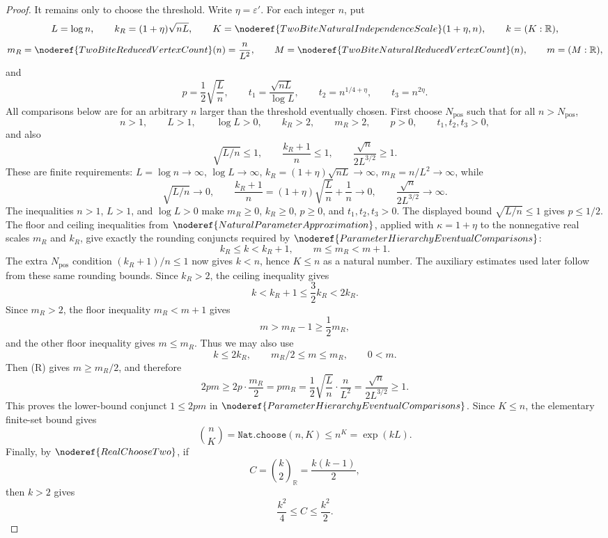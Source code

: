 \begin{proof}
It remains only to choose the threshold.  Write \(\eta=\varepsilon'\).  For
each integer \(n\), put
\[
L=\log n,\qquad
k_R=(1+\eta)\sqrt{nL},\qquad
K=\noderef{TwoBiteNaturalIndependenceScale}(1+\eta,n),\qquad
k=(K:\mathbb R),
\]
\[
m_R=\noderef{TwoBiteReducedVertexCount}(n)=\frac{n}{L^2},\qquad
M=\noderef{TwoBiteNaturalReducedVertexCount}(n),\qquad
m=(M:\mathbb R),
\]
and
\[
p=\frac12\sqrt{\frac{L}{n}},\qquad
t_1=\frac{\sqrt{nL}}{\log L},\qquad
t_2=n^{1/4+\eta},\qquad
t_3=n^{2\eta}.
\]
All comparisons below are for an arbitrary \(n\) larger than the threshold
eventually chosen.  First choose \(N_{\mathrm{pos}}\) such that for all
\(n>N_{\mathrm{pos}}\),
\[
n>1,\qquad L>1,\qquad \log L>0,\qquad k_R>2,\qquad m_R>2,
\qquad p>0,\qquad t_1,t_2,t_3>0,
\]
and also
\[
\sqrt{L/n}\le1,\qquad \frac{k_R+1}{n}\le1,\qquad
\frac{\sqrt n}{2L^{3/2}}\ge1.
\]
These are finite requirements: \(L=\log n\to\infty\),
\(\log L\to\infty\), \(k_R=(1+\eta)\sqrt{nL}\to\infty\),
\(m_R=n/L^2\to\infty\), while
\[
\sqrt{L/n}\to0,\qquad
\frac{k_R+1}{n}
= (1+\eta)\sqrt{\frac Ln}+\frac1n\to0,\qquad
\frac{\sqrt n}{2L^{3/2}}\to\infty.
\]
The inequalities \(n>1\), \(L>1\), and \(\log L>0\) make
\(m_R\ge0\), \(k_R\ge0\), \(p\ge0\), and \(t_1,t_2,t_3>0\).  The displayed
bound \(\sqrt{L/n}\le1\) gives \(p\le1/2\).
The floor and ceiling inequalities from
\(\noderef{NaturalParameterApproximation}\), applied with
\(\kappa=1+\eta\) to the nonnegative real scales \(m_R\) and \(k_R\), give
exactly the rounding conjuncts required by
\(\noderef{ParameterHierarchyEventualComparisons}\):
\[
k_R\le k<k_R+1,\qquad
m\le m_R<m+1.
\]
The extra \(N_{\mathrm{pos}}\) condition \((k_R+1)/n\le1\) now gives
\(k<n\), hence \(K\le n\) as a natural number.
The auxiliary estimates used later follow from these same rounding bounds.
Since \(k_R>2\), the ceiling inequality gives
\[
k<k_R+1\le \frac32k_R<2k_R.
\]
Since \(m_R>2\), the floor inequality \(m_R<m+1\) gives
\[
m>m_R-1\ge \frac12m_R,
\]
and the other floor inequality gives \(m\le m_R\).  Thus we may also use
\[
k\le2k_R,\qquad m_R/2\le m\le m_R,\qquad 0<m.
\tag{R}
\]
Then (R) gives \(m\ge m_R/2\), and therefore
\[
2pm\ge 2p\cdot\frac{m_R}{2}=pm_R
=\frac12\sqrt{\frac Ln}\cdot\frac{n}{L^2}
=\frac{\sqrt n}{2L^{3/2}}\ge1. \tag{P}
\]
This proves the lower-bound conjunct \(1\le2pm\) in
\(\noderef{ParameterHierarchyEventualComparisons}\).
Since \(K\le n\), the elementary finite-set bound gives
\[
\binom{n}{K}
=\texttt{Nat.choose}(n,K)
\le n^K=\exp(kL).
\tag{B}
\]
Finally, by \(\noderef{RealChooseTwo}\), if
\[
C=\binom{k}{2}_{\mathbb R}=\frac{k(k-1)}2,
\]
then \(k>2\) gives
\[
\frac{k^2}{4}\le C\le \frac{k^2}{2}.
\tag{C}
\]


\end{proof}
